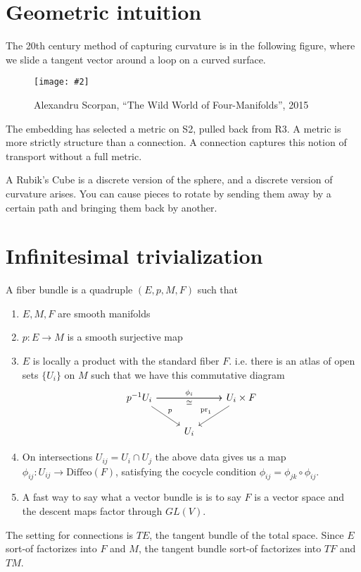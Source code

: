 \documentclass[12pt]{article}
\newcommand{\diffeo}{\mathrm{Diffeo}}
\newcommand{\myfig}[2]{\begin{figure}[h]\caption{#1}\centering\texttt{[image: \#2]}\end{figure}}
\begin{document}
\section{Geometric intuition}
The 20th century method of capturing curvature is in the following figure, where we slide a tangent vector around a loop on a curved surface.

\myfig{Alexandru Scorpan, ``The Wild World of Four-Manifolds'', 2015 \cite{scorpan_wild_2005}}{scorpan_sphere}

The embedding has selected a metric on S2, pulled back from R3. A metric is more strictly structure than a connection. A connection captures this notion of transport without a full metric.

A Rubik's Cube is a discrete version of the sphere, and a discrete version of curvature arises. You can cause pieces to rotate by sending them away by a certain path and bringing them back by another.

\section{Infinitesimal trivialization}
A fiber bundle is a quadruple $(E, p, M, F)$ such that
\begin{enumerate}
    \item $E, M, F$ are smooth manifolds
    \item $p:E\to M$ is a smooth surjective map
    \item $E$ is locally a product with the standard fiber $F$. i.e. there is an atlas of open sets $\{U_i\}$ on $M$ such that we have this commutative diagram
    \[\begin{tikzcd}
        {p^{-1}U_i} && {U_i\times F} \\
        & {U_i}
        \arrow["p", from=1-1, to=2-2]
        \arrow["{\phi_i}", from=1-1, to=1-3]
        \arrow["\cong"', from=1-1, to=1-3]
        \arrow["{\mathrm{pr}_1}"', from=1-3, to=2-2]
    \end{tikzcd}\]
	\item On intersections $U_{ij} = U_i \cap U_j$ the above data gives us a map $\phi_{ij}:U_{ij}\to\diffeo(F)$, satisfying the cocycle condition $\phi_{ij} = \phi_{jk}\circ\phi_{ij}$.
	\item A fast way to say what a vector bundle is is to say $F$ is a vector space and the descent maps factor through $GL(V)$.
\end{enumerate}

The setting for connections is $TE$, the tangent bundle of the total space. Since $E$ sort-of factorizes into $F$ and $M$, the tangent bundle sort-of factorizes into $TF$ and $TM$. 
\end{document}

